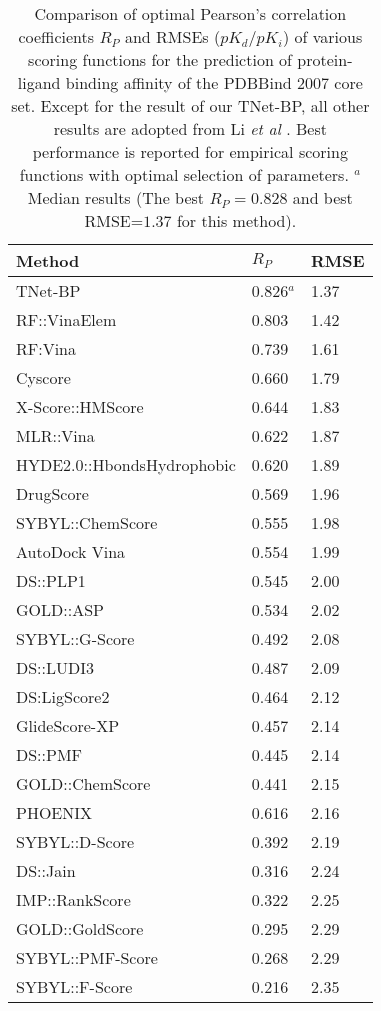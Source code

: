\documentclass[10pt]{article}
\newcommand\BindPCCBest{0.828}
\newcommand\BindRMSEBest{1.37}
\newcommand\BindPCCMedian{0.826}
\newcommand\BindRMSEMedian{1.37}
\begin{document}
\begin{table}[ht]
\centering
{}
\begin{tabular}{lll}
\toprule
\rowcolor{gray!75}
Method & $R_P$ & RMSE \\ 
\midrule
TNet-BP & \BindPCCMedian$^a$ & \BindRMSEMedian \\
RF::VinaElem & 0.803 & 1.42 \\
RF:Vina & 0.739 &1.61 \\ 
Cyscore & 0.660 & 1.79 \\ 
X-Score::HMScore & 0.644 & 1.83 \\
MLR::Vina & 0.622 & 1.87 \\
HYDE2.0::HbondsHydrophobic & 0.620 & 1.89 \\
DrugScore & 0.569 & 1.96 \\
SYBYL::ChemScore & 0.555 & 1.98 \\
AutoDock Vina & 0.554 & 1.99 \\
DS::PLP1 & 0.545 & 2.00 \\
GOLD::ASP & 0.534 & 2.02 \\
SYBYL::G-Score & 0.492 & 2.08 \\
DS::LUDI3 & 0.487 & 2.09 \\
DS:LigScore2 & 0.464 & 2.12 \\
GlideScore-XP & 0.457 & 2.14 \\
DS::PMF & 0.445 & 2.14 \\
GOLD::ChemScore & 0.441 & 2.15 \\
PHOENIX & 0.616 & 2.16 \\
SYBYL::D-Score & 0.392 & 2.19 \\
DS::Jain & 0.316 & 2.24 \\
IMP::RankScore & 0.322 & 2.25 \\
GOLD::GoldScore & 0.295 & 2.29 \\
SYBYL::PMF-Score & 0.268 & 2.29 \\
SYBYL::F-Score & 0.216 & 2.35 \\
\bottomrule
\end{tabular}
\caption{Comparison of optimal Pearson's correlation coefficients $R_P$ and  RMSEs ($pK_d/pK_i$) of various scoring functions for the prediction of protein-ligand binding affinity of the PDBBind 2007 core set. Except for the result of our TNet-BP, all other results are adopted from Li \emph{et al} \cite{HLi:2015}. Best performance is reported for empirical scoring functions with optimal selection of parameters. $^a$ Median results (The best $R_P=\BindPCCBest$ and best RMSE=$\BindRMSEBest$ for this method).%
}
\label{tab:BindingPerformance}
\end{table}
\end{document}
